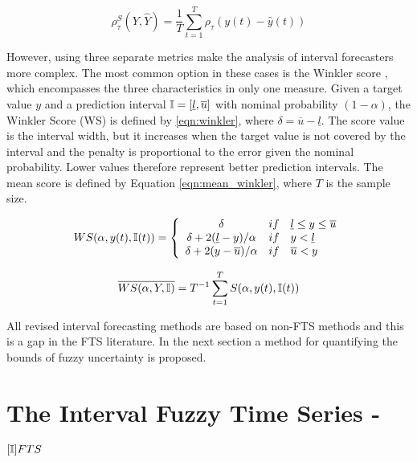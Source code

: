 \begin{equation}
\rho_\tau^S(Y,\hat{Y}) = \frac{1}{T}\sum_{t=1}^T \rho_\tau(y(t) - \hat{y}(t))
\label{eqn:pinball_score}
\end{equation}

However, using three separate metrics make the analysis of interval forecasters more complex. The most common option in these cases is the Winkler score \cite{winklerscore}, which encompasses the three characteristics in only one measure. Given a target value $y$ and a prediction interval $\mathbb{I} = [\underline{l},\overline{u}{]}$ with nominal probability $(1 - \alpha)$, the Winkler Score (WS) is defined by  \eqref{eqn:winkler}, where $\delta = \overline{u} - \underline{l}$. The score value is the interval width, but it increases when the target value is not covered by the interval and the penalty is proportional to the error given the nominal probability. Lower values therefore represent better prediction intervals. The mean score is defined by Equation \eqref{eqn:mean_winkler}, where $T$ is the sample size.

\begin{equation}
WS(\alpha, y(t), \mathbb{I}(t)) = \left\{ \begin{array}{ccl}
\delta & if & \underline{l} \leq y \leq \overline{u} \\
\delta + 2(\underline{l} - y)/\alpha & if & y < \underline{l}  \\
\delta + 2(y - \overline{u})/\alpha & if & \overline{u} < y   
\end{array} \right.
\label{eqn:winkler}
\end{equation}

\begin{equation}
\overline{WS(\alpha, Y, \mathbb{I})} = T^{-1} \sum_{t=1}^T S(\alpha, y(t),\mathbb{I}(t))
\label{eqn:mean_winkler}
\end{equation}

All revised interval forecasting methods are based on non-FTS methods and this is a gap in the FTS literature. In the next section a method for quantifying the bounds of fuzzy uncertainty is proposed.


%
\section{The Interval Fuzzy Time Series  - $[\mathbb{I}]FTS$}
\label{sec:ifts}

